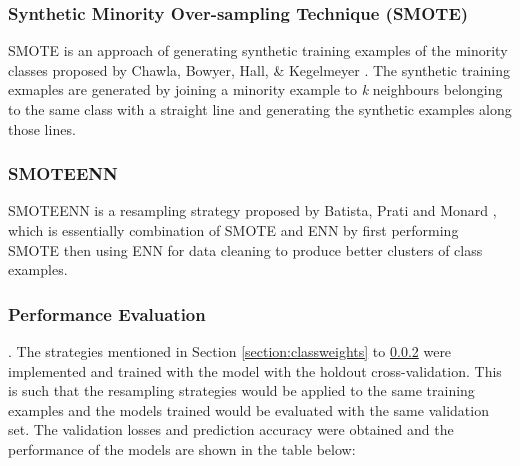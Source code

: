 \documentclass[sigconf,nonacm=true]{acmart}
\begin{document}
\subsubsection{Synthetic Minority Over-sampling Technique (SMOTE)}
SMOTE is an approach of generating synthetic training examples of the minority classes proposed by 
Chawla, Bowyer, Hall, \& Kegelmeyer \cite{Chawla_2002}. The synthetic training exmaples are generated by 
joining a minority example to \textit{k} neighbours belonging to the same class with a straight line 
and generating the synthetic examples along those lines.

\subsubsection{SMOTEENN}
\label{section:smoteenn}
SMOTEENN is a resampling strategy proposed by Batista, Prati and Monard \cite{10.1145/1007730.1007735}, 
which is essentially combination of SMOTE and ENN by first performing SMOTE then using ENN for data cleaning
to produce better clusters of class examples.

\subsubsection{Performance Evaluation}. The strategies mentioned in Section \ref{section:classweights} to 
\ref{section:smoteenn} were implemented and trained with the model with the holdout cross-validation. This is such that 
the resampling strategies would be applied to the same training examples and the models trained would be evaluated with 
the same validation set. The validation losses and prediction accuracy were obtained
and the performance of the models are shown in the table below:
\end{document}
